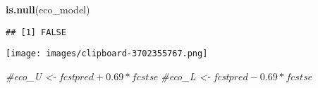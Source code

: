 \documentclass[
]{article}
\newenvironment{Shaded}{\begin{snugshade}}{\end{snugshade}}
\newcommand{\CommentTok}[1]{\textcolor[rgb]{0.56,0.35,0.01}{\textit{#1}}}
\newcommand{\FunctionTok}[1]{\textcolor[rgb]{0.13,0.29,0.53}{\textbf{#1}}}
\newcommand{\NormalTok}[1]{#1}
\begin{document}
\begin{Shaded}
\begin{Highlighting}[]
\FunctionTok{is.null}\NormalTok{(eco\_model)}
\end{Highlighting}
\end{Shaded}

\begin{verbatim}
## [1] FALSE
\end{verbatim}

\texttt{[image: images/clipboard-3702355767.png]}

\begin{Shaded}
\begin{Highlighting}[]
\CommentTok{\#eco\_U \textless{}{-} fcst$pred+0.69*fcst$se}
\CommentTok{\#eco\_L \textless{}{-} fcst$pred{-}0.69*fcst$se}
\end{Highlighting}
\end{Shaded}

\begin{Shaded}
\end{Shaded}
\end{document}
